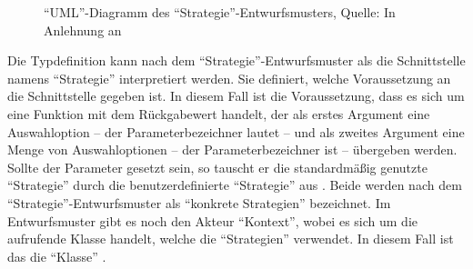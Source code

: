 \ifIncludeFigures
  \begin{figure}[h]
    \centering


    \caption[\enquote{UML}-Diagramm des \enquote{Strategie}-Entwurfsmusters]{\enquote{UML}-Diagramm des \enquote{Strategie}-Entwurfsmusters, Quelle: In Anlehnung an \citet[S. 374]{gamma2009entwurfsmuster}}
    \label{fig:UmlStrategie} 

  \end{figure}%
\fi

Die Typdefinition   kann nach dem \enquote{Strategie}-Entwurfsmuster als die Schnittstelle namens \enquote{Strategie} interpretiert werden.
Sie definiert, welche Voraussetzung an die Schnittstelle gegeben ist.
In diesem Fall ist die Voraussetzung, dass es sich um eine Funktion mit dem Rückgabewert  handelt,
der als erstes Argument eine Auswahloption
-- der Parameterbezeichner lautet  --
und als zweites Argument eine Menge von Auswahloptionen
-- der Parameterbezeichner ist  --
übergeben werden.
Sollte der Parameter  gesetzt sein,
so tauscht er die standardmäßig genutzte \enquote{Strategie}  durch die benutzerdefinierte \enquote{Strategie} aus .
Beide werden nach dem \enquote{Strategie}-Entwurfsmuster als \enquote{konkrete Strategien} bezeichnet.
Im Entwurfsmuster gibt es noch den Akteur \enquote{Kontext},
wobei es sich um die aufrufende Klasse handelt,
welche die \enquote{Strategien} verwendet.
In diesem Fall ist das die \enquote{Klasse} .

